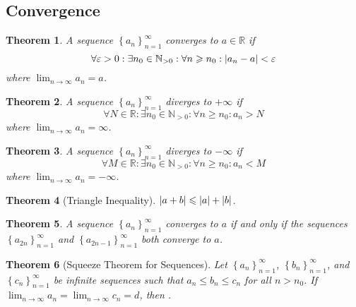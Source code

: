 \documentclass{article}
\newcommand*{\N}{\mathbb{N}}
\newcommand*{\R}{\mathbb{R}}
\theoremstyle{plain}
\newtheorem{theorem}{Theorem}[section]
\numberwithin{theorem}{subsection}
\theoremstyle{definition}
\numberwithin{definition}{subsection}
\theoremstyle{remark}
\numberwithin{note}{section}
\begin{document}
\subsection{Convergence}
\begin{theorem}
	A sequence $\left\{a_n\right\}_{n=1}^\infty$ converges to $a\in \R$ if
	\begin{equation*}
		\forall \varepsilon > 0 : \exists n_0 \in \N_{> 0}:\forall n \geqslant n_0 : \abs{a_n - a} < \varepsilon
	\end{equation*}
	where $\lim_{n \to \infty}a_n = a$.
\end{theorem}
%
\begin{theorem}
	A sequence $\left\{a_n\right\}_{n=1}^\infty$ diverges to $+\infty$ if
	\begin{equation*}
		\forall N \in \R : \exists n_0 \in \N_{> 0}:\forall n \geqslant n_0 : a_n > N
	\end{equation*}
	where $\lim_{n \to \infty}a_n = \infty$.
\end{theorem}
%
\begin{theorem}
	A sequence $\left\{a_n\right\}_{n=1}^\infty$ diverges to $-\infty$ if
	\begin{equation*}
		\forall M \in \R : \exists n_0 \in \N_{> 0}:\forall n \geqslant n_0 : a_n < M
	\end{equation*}
	where $\lim_{n \to \infty}a_n = -\infty$.
\end{theorem}
%
\begin{theorem}[Triangle Inequality]
	$\abs{a+b}\leqslant\abs{a}+\abs{b}$.
\end{theorem}
%
\begin{theorem}
	A sequence $\left\{ a_n \right\}_{n=1}^\infty$ converges to $a$ if and only if the sequences $\left\{ a_{2n} \right\}_{n=1}^\infty$ and $\left\{ a_{2n-1} \right\}_{n=1}^\infty$ both converge to $a$.
\end{theorem}
%
\begin{theorem}[Squeeze Theorem for Sequences]
	Let $\left\{ a_n \right\}_{n=1}^\infty$, $\left\{ b_n \right\}_{n=1}^\infty$, and $\left\{ c_n \right\}_{n=1}^\infty$ be infinite sequences such that $a_n \leqslant b_n \leqslant c_n$ for all $n>n_0$. If $\lim_{n\to\infty}a_n=\lim_{n\to\infty}c_n=d$, then .
\end{theorem}
%
\end{document}
